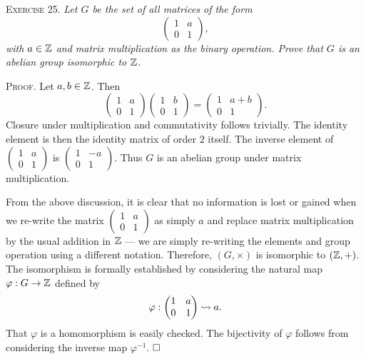 \documentclass[11pt, leqno]{article}
\newcommand{\done}{\ensuremath{\hfill\square}}
\begin{document}
\textsc{Exercise 25}. \emph{Let $G$ be the set of all matrices of the form 
\begin{displaymath}
\begin{pmatrix} 1 & a \\ 0 & 1 \end{pmatrix},
\end{displaymath}
with $a\in\mathbb{Z}$ and matrix multiplication as the binary operation. Prove that $G$ is an abelian group isomorphic to $\mathbb{Z}$.}

\textsc{Proof}. Let $a, b \in \mathbb{Z}$. Then 
\begin{displaymath}
\begin{pmatrix} 1 & a \\ 0 & 1 \end{pmatrix} \begin{pmatrix} 1 & b \\ 0 & 1 \end{pmatrix} = \begin{pmatrix} 1 & a+b \\ 0 & 1 \end{pmatrix}.
\end{displaymath} Closure under multiplication and commutativity follows trivially. The identity element is then the identity matrix of order $2$ itself. The inverse element of $\displaystyle \begin{pmatrix} 1 & a \\ 0 & 1 \end{pmatrix}$ is $\displaystyle \begin{pmatrix} 1 & -a \\ 0 & 1 \end{pmatrix}$. Thus $G$ is an abelian group under matrix multiplication.

From the above discussion, it is clear that no information is lost or gained when we re-write the matrix $\displaystyle \begin{pmatrix} 1 & a \\ 0 & 1 \end{pmatrix}$ as simply $a$ and replace matrix multiplication by the usual addition in $\mathbb{Z}$ --- we are simply re-writing the elements and group operation using a different notation. Therefore, $(G, \times)$ is isomorphic to $(\mathbb{Z}, +)$. The isomorphism is formally established by considering the natural map $\varphi : G \to \mathbb{Z}$ defined by 
\begin{displaymath}
\varphi: \begin{pmatrix} 1 & a \\ 0 & 1 \end{pmatrix} \rightsquigarrow a.
\end{displaymath}
That $\varphi$ is a homomorphism is easily checked. The bijectivity of $\varphi$ follows from considering the inverse map $\varphi^{-1}$. \done
\end{document}
